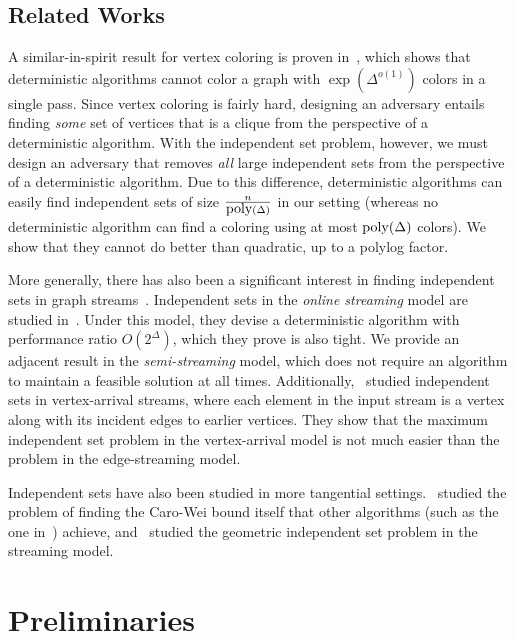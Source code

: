 \documentclass[11pt]{article}
\theoremstyle{definition}
\newcommand{\poly}{\mbox{\rm poly}}
\begin{document}
\subsection{Related Works}

A similar-in-spirit result for vertex coloring is proven in~\cite{assadi2022deterministic}, which shows that deterministic algorithms cannot color a graph with $\exp(\Delta^{o(1)})$ colors in a single pass. Since vertex coloring is fairly hard, designing an adversary entails finding \textit{some} set of vertices that is a clique from the perspective of a deterministic algorithm. With the independent set problem, however, we must design an adversary that removes \textit{all} large independent sets from the perspective of a deterministic algorithm. Due to this difference, deterministic algorithms can easily find independent sets of size $\frac n{\poly(\Delta)}$ in our setting (whereas no deterministic algorithm can find a coloring using at most $\poly(\Delta)$ colors). We show that they cannot do better than quadratic, up to a polylog factor. 

More generally, there has also been a significant interest in finding independent sets in graph streams\ \cite{ahn2015correlation, assadi2024log, halldorsson2010streaming, chen2023sublinear, cormode2017independent, bhore2022streaming, bakshi2019weighted}. Independent sets in the \textit{online streaming} model are studied in~\cite{halldorsson2016streaming}. Under this model, they devise a deterministic algorithm with performance ratio $O(2^{\Delta})$, which they prove is also tight. We provide an adjacent result in the \textit{semi-streaming} model, which does not require an algorithm to maintain a feasible solution at all times. Additionally,\ \cite{cormode2018independent} studied independent sets in vertex-arrival streams, where each element in the input stream is a vertex along with its incident edges to earlier vertices. They show that the maximum independent set problem in the vertex-arrival model is not much easier than the problem in the edge-streaming model. 

Independent sets have also been studied in more tangential settings.\ \cite{cormode2018approximating} studied the problem of finding the Caro-Wei bound itself that other algorithms (such as the one in\ \cite{halldorsson2010streaming}) achieve, and\ \cite{bhore2022streaming} studied the geometric independent set problem in the streaming model. 


\section{Preliminaries}
\newcommand{\Partition}{\textnormal{\textsc{Partition}}}
\newcommand{\CP}{\mathcal{P}}
\end{document}
